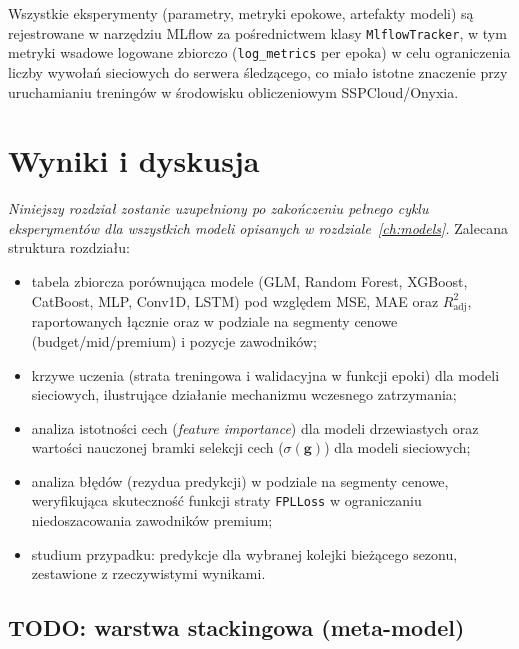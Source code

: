\documentclass[a4paper,twoside,11pt]{mwrep}
\theoremstyle{plain} \newtheorem{thm}{Twierdzenie}
\theoremstyle{plain} \newtheorem{lem}{Lemat}
\theoremstyle{definition} \newtheorem{defn}{Definicja}
\theoremstyle{remark} \newtheorem*{rem}{Wniosek}
\begin{document}
Wszystkie eksperymenty (parametry, metryki epokowe, artefakty modeli)
są rejestrowane w narzędziu MLflow za pośrednictwem klasy
\texttt{MlflowTracker}, w tym metryki wsadowe logowane zbiorczo
(\texttt{log\_metrics} per epoka) w celu ograniczenia liczby wywołań
sieciowych do serwera śledzącego, co miało istotne znaczenie przy
uruchamianiu treningów w środowisku obliczeniowym SSPCloud/Onyxia.

\chapter{Wyniki i dyskusja}\label{ch:results}

\emph{Niniejszy rozdział zostanie uzupełniony po zakończeniu pełnego cyklu
eksperymentów dla wszystkich modeli opisanych w
rozdziale~\ref{ch:models}.} Zalecana struktura rozdziału:

\begin{itemize}
    \item tabela zbiorcza porównująca modele (GLM, Random Forest, XGBoost,
    CatBoost, MLP, Conv1D, LSTM) pod względem MSE, MAE oraz
    $R^2_{\text{adj}}$, raportowanych łącznie oraz w podziale na segmenty
    cenowe (budget/mid/premium) i pozycje zawodników;
    \item krzywe uczenia (strata treningowa i walidacyjna w funkcji epoki)
    dla modeli sieciowych, ilustrujące działanie mechanizmu wczesnego
    zatrzymania;
    \item analiza istotności cech (\emph{feature importance}) dla modeli
    drzewiastych oraz wartości nauczonej bramki selekcji cech
    ($\sigma(\mathbf{g})$) dla modeli sieciowych;
    \item analiza błędów (rezydua predykcji) w podziale na segmenty
    cenowe, weryfikująca skuteczność funkcji straty \texttt{FPLLoss} w
    ograniczaniu niedoszacowania zawodników premium;
    \item studium przypadku: predykcje dla wybranej kolejki bieżącego
    sezonu, zestawione z rzeczywistymi wynikami.
\end{itemize}

\section*{TODO: warstwa stackingowa (meta-model)}

\noindent{}
\end{document}
